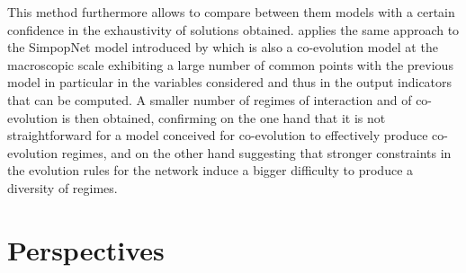 \documentclass[10pt]{article}
\begin{document}
This method furthermore allows to compare between them models with a certain confidence in the exhaustivity of solutions obtained. \cite{raimbault2018unveiling} applies the same approach to the SimpopNet model introduced by \cite{schmitt2014modelisation} which is also a co-evolution model at the macroscopic scale exhibiting a large number of common points with the previous model in particular in the variables considered and thus in the output indicators that can be computed. A smaller number of regimes of interaction and of co-evolution is then obtained, confirming on the one hand that it is not straightforward for a model conceived for co-evolution to effectively produce co-evolution regimes, and on the other hand suggesting that stronger constraints in the evolution rules for the network induce a bigger difficulty to produce a diversity of regimes.



\section{Perspectives}
\end{document}
